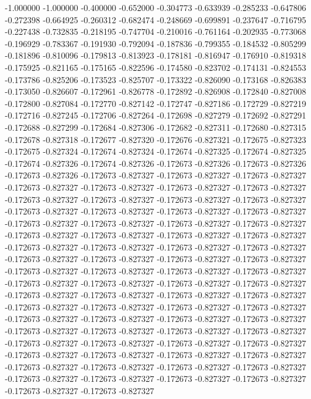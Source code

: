 -1.000000
-1.000000
-0.400000
-0.652000
-0.304773
-0.633939
-0.285233
-0.647806
-0.272398
-0.664925
-0.260312
-0.682474
-0.248669
-0.699891
-0.237647
-0.716795
-0.227438
-0.732835
-0.218195
-0.747704
-0.210016
-0.761164
-0.202935
-0.773068
-0.196929
-0.783367
-0.191930
-0.792094
-0.187836
-0.799355
-0.184532
-0.805299
-0.181896
-0.810096
-0.179813
-0.813923
-0.178181
-0.816947
-0.176910
-0.819318
-0.175925
-0.821165
-0.175165
-0.822596
-0.174580
-0.823702
-0.174131
-0.824553
-0.173786
-0.825206
-0.173523
-0.825707
-0.173322
-0.826090
-0.173168
-0.826383
-0.173050
-0.826607
-0.172961
-0.826778
-0.172892
-0.826908
-0.172840
-0.827008
-0.172800
-0.827084
-0.172770
-0.827142
-0.172747
-0.827186
-0.172729
-0.827219
-0.172716
-0.827245
-0.172706
-0.827264
-0.172698
-0.827279
-0.172692
-0.827291
-0.172688
-0.827299
-0.172684
-0.827306
-0.172682
-0.827311
-0.172680
-0.827315
-0.172678
-0.827318
-0.172677
-0.827320
-0.172676
-0.827321
-0.172675
-0.827323
-0.172675
-0.827324
-0.172674
-0.827324
-0.172674
-0.827325
-0.172674
-0.827325
-0.172674
-0.827326
-0.172674
-0.827326
-0.172673
-0.827326
-0.172673
-0.827326
-0.172673
-0.827326
-0.172673
-0.827327
-0.172673
-0.827327
-0.172673
-0.827327
-0.172673
-0.827327
-0.172673
-0.827327
-0.172673
-0.827327
-0.172673
-0.827327
-0.172673
-0.827327
-0.172673
-0.827327
-0.172673
-0.827327
-0.172673
-0.827327
-0.172673
-0.827327
-0.172673
-0.827327
-0.172673
-0.827327
-0.172673
-0.827327
-0.172673
-0.827327
-0.172673
-0.827327
-0.172673
-0.827327
-0.172673
-0.827327
-0.172673
-0.827327
-0.172673
-0.827327
-0.172673
-0.827327
-0.172673
-0.827327
-0.172673
-0.827327
-0.172673
-0.827327
-0.172673
-0.827327
-0.172673
-0.827327
-0.172673
-0.827327
-0.172673
-0.827327
-0.172673
-0.827327
-0.172673
-0.827327
-0.172673
-0.827327
-0.172673
-0.827327
-0.172673
-0.827327
-0.172673
-0.827327
-0.172673
-0.827327
-0.172673
-0.827327
-0.172673
-0.827327
-0.172673
-0.827327
-0.172673
-0.827327
-0.172673
-0.827327
-0.172673
-0.827327
-0.172673
-0.827327
-0.172673
-0.827327
-0.172673
-0.827327
-0.172673
-0.827327
-0.172673
-0.827327
-0.172673
-0.827327
-0.172673
-0.827327
-0.172673
-0.827327
-0.172673
-0.827327
-0.172673
-0.827327
-0.172673
-0.827327
-0.172673
-0.827327
-0.172673
-0.827327
-0.172673
-0.827327
-0.172673
-0.827327
-0.172673
-0.827327
-0.172673
-0.827327
-0.172673
-0.827327
-0.172673
-0.827327
-0.172673
-0.827327
-0.172673
-0.827327
-0.172673
-0.827327
-0.172673
-0.827327
-0.172673
-0.827327
-0.172673
-0.827327
-0.172673
-0.827327
-0.172673
-0.827327
-0.172673
-0.827327
-0.172673
-0.827327
-0.172673
-0.827327
-0.172673
-0.827327
